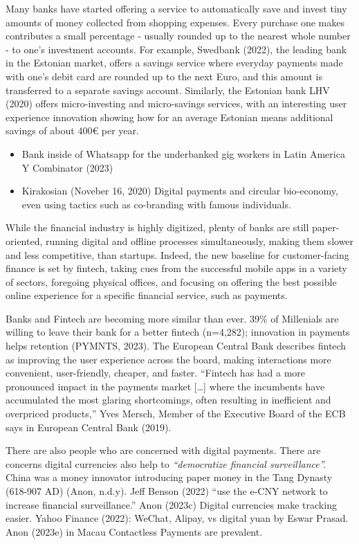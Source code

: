 \documentclass[
  letterpaper,
  DIV=11,
  numbers=noendperiod]{scrartcl}
\providecommand{\tightlist}{%
  \setlength{\itemsep}{0pt}\setlength{\parskip}{0pt}}\usepackage{longtable,booktabs,array}
\begin{document}
Many banks have started offering a service to automatically save and
invest tiny amounts of money collected from shopping expenses. Every
purchase one makes contributes a small percentage - usually rounded up
to the nearest whole number - to one's investment accounts. For example,
Swedbank (2022), the leading bank in the Estonian market, offers a
savings service where everyday payments made with one's debit card are
rounded up to the next Euro, and this amount is transferred to a
separate savings account. Similarly, the Estonian bank LHV (2020) offers
micro-investing and micro-savings services, with an interesting user
experience innovation showing how for an average Estonian means
additional savings of about 400€ per year.

\begin{itemize}
\tightlist
\item
  Bank inside of Whatsapp for the underbanked gig workers in Latin
  America Y Combinator (2023)
\item
  Kirakosian (Noveber 16, 2020) Digital payments and circular
  bio-economy, even using tactics such as co-branding with famous
  individuals.
\end{itemize}

While the financial industry is highly digitized, plenty of banks are
still paper-oriented, running digital and offline processes
simultaneously, making them slower and less competitive, than startups.
Indeed, the new baseline for customer-facing finance is set by fintech,
taking cues from the successful mobile apps in a variety of sectors,
foregoing physical offices, and focusing on offering the best possible
online experience for a specific financial service, such as payments.

Banks and Fintech are becoming more similar than ever. 39\% of
Millenials are willing to leave their bank for a better fintech
(n=4,282); innovation in payments helps retention (PYMNTS, 2023). The
European Central Bank describes fintech as improving the user experience
across the board, making interactions more convenient, user-friendly,
cheaper, and faster. ``Fintech has had a more pronounced impact in the
payments market {[}\ldots{]} where the incumbents have accumulated the
most glaring shortcomings, often resulting in inefficient and overpriced
products,'' Yves Mersch, Member of the Executive Board of the ECB says
in European Central Bank (2019).

There are also people who are concerned with digital payments. There are
concerns digital currencies also help to \emph{``democratize financial
surveillance''.} China was a money innovator introducing paper money in
the Tang Dynasty (618-907 AD) (Anon, n.d.y). Jeff Benson (2022) ``use
the e-CNY network to increase financial surveillance.'' Anon (2023c)
Digital currencies make tracking easier. Yahoo Finance (2022): WeChat,
Alipay, vs digital yuan by Eswar Prasad. Anon (2023e) in Macau
Contactless Payments are prevalent.
\end{document}
